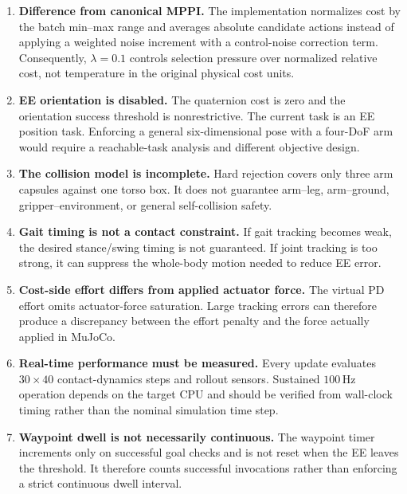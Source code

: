 \documentclass[11pt,a4paper]{article}
\begin{document}
\begin{enumerate}
  \item \textbf{Difference from canonical MPPI.}
  The implementation normalizes cost by the batch min--max range and averages
  absolute candidate actions instead of applying a weighted noise increment
  with a control-noise correction term. Consequently, $\lambda=0.1$ controls
  selection pressure over normalized relative cost, not temperature in the
  original physical cost units.

  \item \textbf{EE orientation is disabled.}
  The quaternion cost is zero and the orientation success threshold is
  nonrestrictive. The current task is an EE position task. Enforcing a general
  six-dimensional pose with a four-DoF arm would require a reachable-task
  analysis and different objective design.

  \item \textbf{The collision model is incomplete.}
  Hard rejection covers only three arm capsules against one torso box. It does
  not guarantee arm--leg, arm--ground, gripper--environment, or general
  self-collision safety.

  \item \textbf{Gait timing is not a contact constraint.}
  If gait tracking becomes weak, the desired stance/swing timing is not
  guaranteed. If joint tracking is too strong, it can suppress the whole-body
  motion needed to reduce EE error.

  \item \textbf{Cost-side effort differs from applied actuator force.}
  The virtual PD effort omits actuator-force saturation. Large tracking errors
  can therefore produce a discrepancy between the effort penalty and the
  force actually applied in MuJoCo.

  \item \textbf{Real-time performance must be measured.}
  Every update evaluates $30\times40$ contact-dynamics steps and rollout
  sensors. Sustained $100\,\mathrm{Hz}$ operation depends on the target CPU and
  should be verified from wall-clock timing rather than the nominal simulation
  time step.

  \item \textbf{Waypoint dwell is not necessarily continuous.}
  The waypoint timer increments only on successful goal checks and is not
  reset when the EE leaves the threshold. It therefore counts successful
  invocations rather than enforcing a strict continuous dwell interval.
\end{enumerate}
\end{document}
